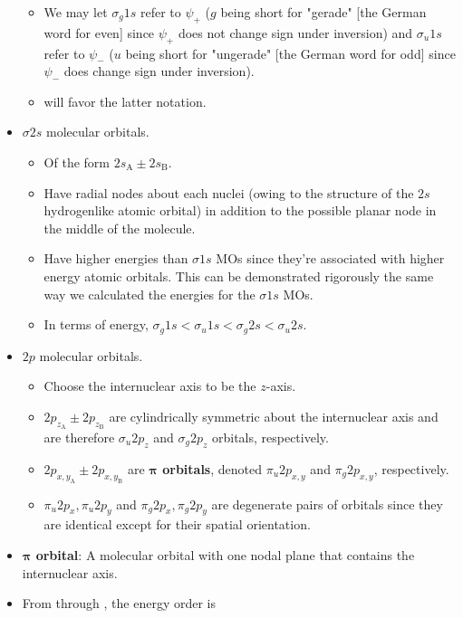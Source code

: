 \documentclass[../notes.tex]{subfiles}
\begin{document}
\begin{itemize}
\begin{itemize}
        \item We may let $\sigma_g1s$ refer to $\psi_+$ ($g$ being short for "gerade" [the German word for even] since $\psi_+$ does not change sign under inversion) and $\sigma_u1s$ refer to $\psi_-$ ($u$ being short for "ungerade" [the German word for odd] since $\psi_-$ does change sign under inversion).
        \item \textcite{bib:McQuarrieSimon} will favor the latter notation.
    \end{itemize}
    \item $\sigma 2s$ molecular orbitals.
    \begin{itemize}
        \item Of the form $2s_\text{A}\pm 2s_\text{B}$.
        \item Have radial nodes about each nuclei (owing to the structure of the $2s$ hydrogenlike atomic orbital) in addition to the possible planar node in the middle of the molecule.
        \item Have higher energies than $\sigma 1s$ MOs since they're associated with higher energy atomic orbitals. This can be demonstrated rigorously the same way we calculated the energies for the $\sigma 1s$ MOs.
        \item In terms of energy, $\sigma_g1s<\sigma_u1s<\sigma_g2s<\sigma_u2s$.
    \end{itemize}
    \item $2p$ molecular orbitals.
    \begin{itemize}
        \item Choose the internuclear axis to be the $z$-axis.
        \item $2p_{z_\text{A}}\pm 2p_{z_\text{B}}$ are cylindrically symmetric about the internuclear axis and are therefore $\sigma_u2p_z$ and $\sigma_g2p_z$ orbitals, respectively.
        \item $2p_{x,y_\text{A}}\pm 2p_{x,y_\text{B}}$ are \textbf{$\bm{\pi}$ orbitals}, denoted $\pi_u2p_{x,y}$ and $\pi_g2p_{x,y}$, respectively.
        \item $\pi_u2p_x,\pi_u2p_y$ and $\pi_g2p_x,\pi_g2p_y$ are degenerate pairs of orbitals since they are identical except for their spatial orientation.
    \end{itemize}
    \item \textbf{$\bm{\pi}$ orbital}: A molecular orbital with one nodal plane that contains the internuclear axis.
    \item From  through , the energy order is
    \begin{equation*}

\end{equation*}
\end{itemize}
\end{document}
